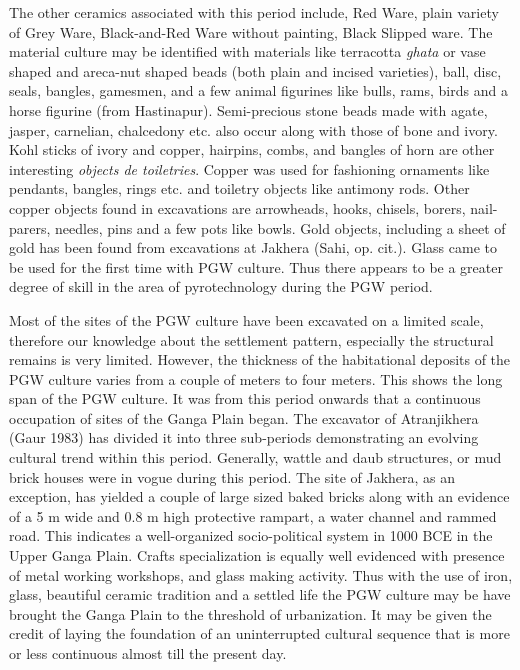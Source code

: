 The other ceramics associated with this period include, Red Ware, plain variety of Grey Ware, Black-and-Red Ware without painting, Black Slipped ware. The material culture may be identified with materials like terracotta \textit{ghata} or vase shaped and areca-nut shaped beads (both plain and incised varieties), ball, disc, seals, bangles, gamesmen, and a few animal figurines like bulls, rams, birds and a horse figurine (from Hastinapur). Semi-precious stone beads made with agate, jasper, carnelian, chalcedony etc. also occur along with those of bone and ivory. Kohl sticks of ivory and copper, hairpins, combs, and bangles of horn are other interesting \textit{objects de toiletries}. Copper was used for fashioning ornaments like pendants, bangles, rings etc. and toiletry objects like antimony rods. Other copper objects found in excavations are arrowheads, hooks, chisels, borers, nail-parers, needles, pins and a few pots like bowls. Gold objects, including a sheet of gold has been found from excavations at Jakhera (Sahi, op. cit.). Glass came to be used for the first time with PGW culture. Thus there appears to be a greater degree of skill in the area of pyrotechnology during the PGW period.

Most of the sites of the PGW culture have been excavated on a limited scale, therefore our knowledge about the settlement pattern, especially the structural remains is very limited. However, the thickness of the habitational deposits of the PGW culture varies from a couple of meters to four meters. This shows the long span of the PGW culture. It was from this period onwards that a continuous occupation of sites of the Ganga Plain began. The excavator of Atranjikhera (Gaur 1983) has divided it into three sub-periods demonstrating an evolving cultural trend within this period. Generally, wattle and daub structures, or mud brick houses were in vogue during this period. The site of Jakhera, as an exception, has yielded a couple of large sized baked bricks along with an evidence of a 5 m wide and 0.8 m high protective rampart, a water channel and rammed road. This indicates a well-organized socio-political system in 1000 BCE in the Upper Ganga Plain. Crafts specialization is equally well evidenced with presence of metal working workshops, and glass making activity. Thus with the use of iron, glass, beautiful ceramic tradition and a settled life the PGW culture may be have brought the Ganga Plain to the threshold of urbanization. It may be given the credit of laying the foundation of an uninterrupted cultural sequence that is more or less continuous almost till the present day.

